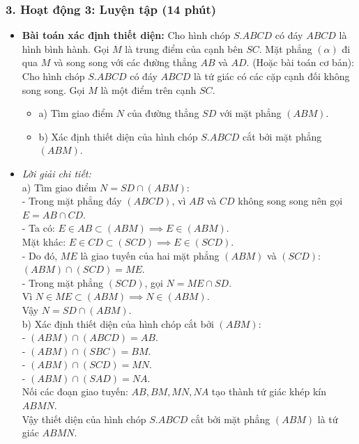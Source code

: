 \documentclass[12pt, a4paper]{article}
\begin{document}
\subsubsection*{3. Hoạt động 3: Luyện tập (14 phút)}
\begin{itemize}
    \item \textbf{Bài toán xác định thiết diện:} Cho hình chóp $S.ABCD$ có đáy $ABCD$ là hình bình hành. Gọi $M$ là trung điểm của cạnh bên $SC$. Mặt phẳng $(\alpha)$ đi qua $M$ và song song với các đường thẳng $AB$ và $AD$.
    (Hoặc bài toán cơ bản): Cho hình chóp $S.ABCD$ có đáy $ABCD$ là tứ giác có các cặp cạnh đối không song song. Gọi $M$ là một điểm trên cạnh $SC$.
    \begin{itemize}
        \item a) Tìm giao điểm $N$ của đường thẳng $SD$ với mặt phẳng $(ABM)$.
        \item b) Xác định thiết diện của hình chóp $S.ABCD$ cắt bởi mặt phẳng $(ABM)$.
    \end{itemize}
    \item \textit{Lời giải chi tiết:}\\
    a) Tìm giao điểm $N = SD \cap (ABM)$:\\
    - Trong mặt phẳng đáy $(ABCD)$, vì $AB$ và $CD$ không song song nên gọi $E = AB \cap CD$.\\
    - Ta có: $E \in AB \subset (ABM) \implies E \in (ABM)$.\\
    Mặt khác: $E \in CD \subset (SCD) \implies E \in (SCD)$.\\
    - Do đó, $ME$ là giao tuyến của hai mặt phẳng $(ABM)$ và $(SCD)$:\\
    $(ABM) \cap (SCD) = ME$.\\
    - Trong mặt phẳng $(SCD)$, gọi $N = ME \cap SD$.\\
    Vì $N \in ME \subset (ABM) \implies N \in (ABM)$.\\
    Vậy $N = SD \cap (ABM)$.\\
    b) Xác định thiết diện của hình chóp cắt bởi $(ABM)$:\\
    - $(ABM) \cap (ABCD) = AB$.\\
    - $(ABM) \cap (SBC) = BM$.\\
    - $(ABM) \cap (SCD) = MN$.\\
    - $(ABM) \cap (SAD) = NA$.\\
    Nối các đoạn giao tuyến: $AB, BM, MN, NA$ tạo thành tứ giác khép kín $ABMN$.\\
    Vậy thiết diện của hình chóp $S.ABCD$ cắt bởi mặt phẳng $(ABM)$ là tứ giác $ABMN$.
\end{itemize}
\end{document}
